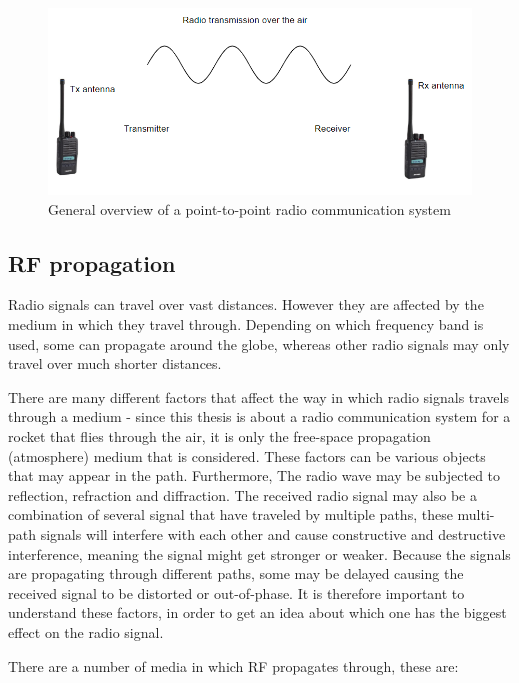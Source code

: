 \begin{figure}[h]
\centering
\includegraphics[scale=0.55]{figures/GeneralOverview.PNG}
\caption{General overview of a point-to-point radio communication system}
\end{figure}

\subsection{RF propagation}
Radio signals can travel over vast distances. However they are affected by the medium in which they travel through. Depending on which frequency band is used\cite{FrequencyBand}, some can propagate around the globe, whereas other radio signals may only travel over much shorter distances.

There are many different factors that affect the way in which radio signals travels through a medium - since this thesis is about a radio communication system for a rocket that flies through the air, it is only the free-space propagation (atmosphere) medium that is considered. These factors can be various objects that may appear in the path. Furthermore, The radio wave may be subjected to reflection, refraction and diffraction. The received radio signal may also be a combination of several signal that have traveled by multiple paths, these multi-path signals will interfere with each other and cause constructive and destructive interference, meaning the signal might get stronger or weaker. Because the signals are propagating through different paths, some may be delayed causing the received signal to be distorted or out-of-phase. It is therefore important to understand these factors, in order to get an idea about which one has the biggest effect on the radio signal. 

There are a number of media in which RF propagates through, these are: 

